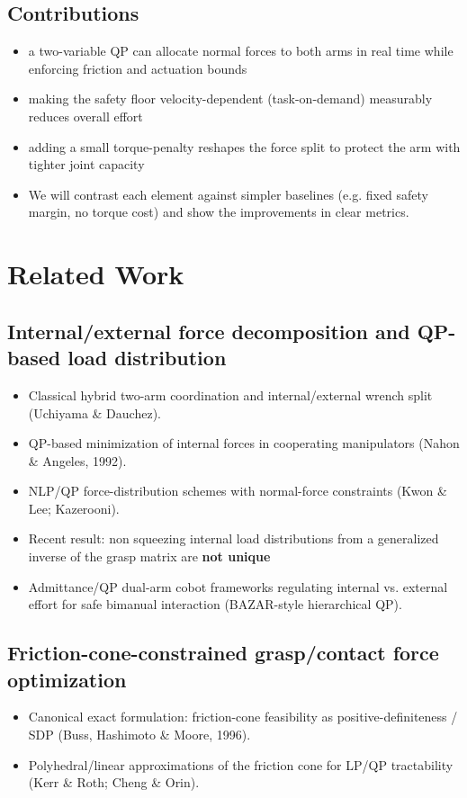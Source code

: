 \documentclass[conference]{IEEEtran}
\begin{document}
\subsection{Contributions}
\begin{itemize}
    \item a two-variable QP can allocate normal forces to both arms in real time while enforcing friction and actuation bounds
    \item making the safety floor velocity-dependent (task-on-demand) measurably reduces overall effort
    \item adding a small torque-penalty reshapes the force split to protect the arm with tighter joint capacity
    \item We will contrast each element against simpler baselines (e.g. fixed safety margin, no torque cost) and show the improvements in clear metrics.  
\end{itemize}


\section{Related Work}

\subsection{Internal/external force decomposition and QP-based load distribution}
\begin{itemize}
    \item Classical hybrid two-arm coordination and internal/external wrench split (Uchiyama \& Dauchez).
    \item QP-based minimization of internal forces in cooperating manipulators (Nahon \& Angeles, 1992).
    \item NLP/QP force-distribution schemes with normal-force constraints (Kwon \& Lee; Kazerooni).
    \item Recent result: non squeezing internal load distributions from a generalized inverse of the grasp matrix are \textbf{not unique}
    \item Admittance/QP dual-arm cobot frameworks regulating internal vs. external effort for safe bimanual interaction (BAZAR-style hierarchical QP).
\end{itemize}

\subsection{Friction-cone-constrained grasp/contact force optimization}
\begin{itemize}
    \item Canonical exact formulation: friction-cone feasibility as positive-definiteness / SDP (Buss, Hashimoto \& Moore, 1996).
    \item Polyhedral/linear approximations of the friction cone for LP/QP tractability (Kerr \& Roth; Cheng \& Orin).
\end{itemize}
\end{document}
